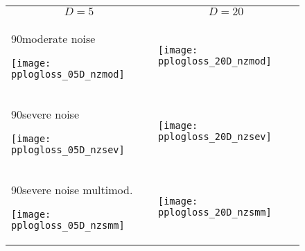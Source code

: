 \documentclass[sigconf]{acmart}
\newcommand{\rot}[2][2.5]{
  \hspace*{-3.5\baselineskip}%
  \begin{rotate}{90}\hspace{#1em}#2
  \end{rotate}}
\begin{document}
{%


\begin{figure}
\begin{tabular}{@{}l@{}@{}l@{}}
\multicolumn{1}{c}{$D=5$} & \multicolumn{1}{c}{$D=20$}\\
\rot{moderate noise}
\hspace*{-1mm}
\texttt{[image: pplogloss\_05D\_nzmod]} &
\texttt{[image: pplogloss\_20D\_nzmod]} \\[-2ex]
\rot{severe noise}
\hspace*{-1mm}
\texttt{[image: pplogloss\_05D\_nzsev]} &
\texttt{[image: pplogloss\_20D\_nzsev]} \\[-2ex]
\rot[0.5]{severe noise multimod.}
\hspace*{-1mm}
\texttt{[image: pplogloss\_05D\_nzsmm]} &
\texttt{[image: pplogloss\_20D\_nzsmm]}
\end{tabular}
\caption{\label{fig:aRTlogloss}%
\bbobloglossfigurecaption{}
}
\end{figure}



}{} %
\end{document}
